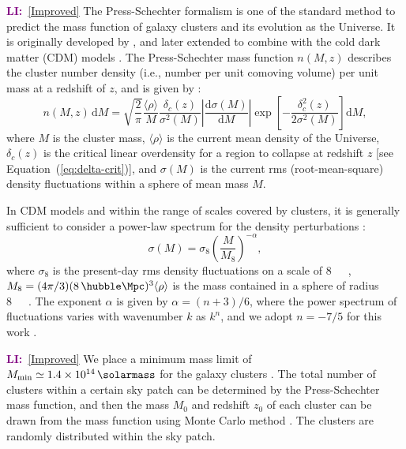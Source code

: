 \documentclass[modern]{aastex61}
\newcommand{\R}[1]{\mathrm{#1}}
\newcommand{\D}[1]{\R{d} #1}
\newcommand{\diff}[2]{\frac{\D{#1}}{\D{#2}}}
\newcommand{\LI}[1]{\textcolor{purple}{\textbf{LI:}}~\uline{#1}}
\begin{document}
\LI{[Improved]}
The Press-Schechter formalism is one of the standard method to predict
the mass function of galaxy clusters and its evolution as the Universe.
It is originally developed by \citet{press1974}, and later extended to
combine with the cold dark matter (CDM) models
\citep[e.g.,][]{bond1991,lacey1993}.
The Press-Schechter mass function $n(M, z)$ describes the cluster
number density (i.e., number per unit comoving volume) per unit mass
at a redshift of $z$, and is given by \citep{press1974}:
\begin{equation}
  \label{eq:ps-mass-func}
  n(M, z) \,\D{M} = \sqrt{\frac{2}{\pi}} \frac{\langle{\rho}\rangle}{M}
  \frac{\delta_c(z)}{\sigma^2(M)} \left| \diff{\sigma(M)}{M} \right|
  \exp\!\left[ -\frac{\delta_c^2(z)}{2\sigma^2(M)} \right] \D{M},
\end{equation}
where
$M$ is the cluster mass,
$\langle {\rho} \rangle$ is the current mean density of the Universe,
$\delta_c(z)$ is the critical linear overdensity for a region to collapse
at redshift $z$ [see Equation~(\ref{eq:delta-crit})],
and $\sigma(M)$ is the current rms (root-mean-square) density fluctuations
within a sphere of mean mass $M$.

In CDM models and within the range of scales covered by clusters,
it is generally sufficient to consider a power-law spectrum
for the density perturbations \citep{sarazin2002,randall2002}:
\begin{equation}
  \label{eq:sigma-mass}
  \sigma(M) = \sigma_8 \left( \frac{M}{M_8} \right)^{-\alpha},
\end{equation}
where $\sigma_8$ is the present-day rms density fluctuations on a
scale of \SI{8}{\per\hubble\Mpc},
$M_8 = (4\pi/3)(8 \,\si{\per\hubble\Mpc})^3 \langle{\rho}\rangle$
is the mass contained in a sphere of radius \SI{8}{\per\hubble\Mpc}.
The exponent $\alpha$ is given by $\alpha = (n+3)/6$, where
the power spectrum of fluctuations varies with wavenumber $k$
as $k^n$, and we adopt $n = -7/5$ for this work \citep{randall2002}.

\LI{[Improved]}
We place a minimum mass limit of $M_{\R{min}} \simeq \SI{1.4e14}{\solarmass}$
for the galaxy clusters \citep{zandanel2014}.
The total number of clusters within a certain sky patch can be
determined by the Press-Schechter mass function, and then the mass
$M_0$ and redshift $z_0$ of each cluster can be drawn from the mass
function using Monte Carlo method \citep{wang2010}.
The clusters are randomly distributed within the sky patch.


\end{document}
